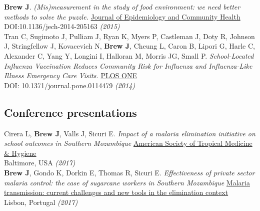 \documentclass[11pt]{article}
\begin{document}
\noindent \textbf{Brew J}. \emph{(Mis)measurement in the study of food environment: we need better methods to solve the puzzle.} \href{http://jech.bmj.com/}{Journal of Epidemiology and Community Health} \\
DOI:10.1136/jech-2014-205163 \hfill \emph{(2015)}\\


\noindent Tran C, Sugimoto J, Pulliam J, Ryan K, Myers P, Castleman J, Doty R, Johnson J, Stringfellow J, Kovacevich N, \textbf{Brew J}, Cheung L, Caron B, Lipori G, Harle C, Alexander C, Yang Y, Longini I, Halloran M, Morris JG, Small P. \emph{School-Located Influenza Vaccination Reduces Community Risk for Influenza and Influenza-Like Illness Emergency Care Visits.} \href{http://journals.plos.org/plosone/article?id=10.1371/journal.pone.0114479}{PLOS ONE} \\
DOI: 10.1371/journal.pone.0114479 \hfill \emph{(2014)}\\

% 


\subsection*{Conference presentations}

\noindent Cirera L, \textbf{Brew J}, Valls J, Sicuri E. \emph{Impact of a malaria elimination initiative on school outcomes in Southern Mozambique} \href{http://www.astmh.org/annual-meeting}{American Society of Tropical Medicine & Hygiene} \\
Baltimore, USA \hfill \emph{(2017)}\\

\noindent \textbf{Brew J}, Gondo K, Dorkin E, Thomas R, Sicuri E. \emph{Effectiveness of private sector malaria control: the case of sugarcane workers in Southern Mozambique} \href{http://www.ihmt.unl.pt/en/workshop-malaria-transmission-en/}{Malaria transmission: current challenges and new tools in the elimination context} \\
Lisbon, Portugal \hfill \emph{(2017)}\\
\end{document}
